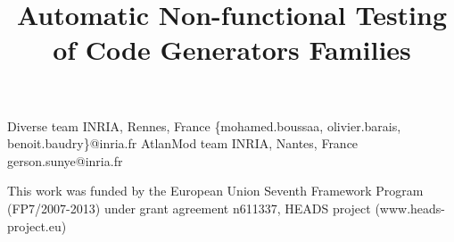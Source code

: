 \documentclass[preprint,10pt]{sigplanconf}
\begin{document}
 

\title{Automatic Non-functional Testing of Code Generators Families}
 

           {Diverse team INRIA, Rennes, France}
           { \{mohamed.boussaa, olivier.barais, benoit.baudry\}@inria.fr}
           {AtlanMod team INRIA, Nantes, France}
           {gerson.sunye@inria.fr}


\maketitle

\newcommand{\etal}{et al.}
\newcommand{\eg}[0]{e.\,g.}
\newcommand{\ie}[0]{i.\,e.}

\vspace*{-0.5cm}


\vfill



%






 

 
 

\acks

This work was funded by the European Union Seventh Framework Program (FP7/2007-2013) under grant agreement n611337, HEADS project (www.heads-project.eu)






 

 
\end{document}

